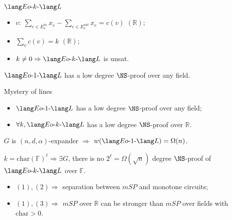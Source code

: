 \begin{frame}{$\EoL[k]$}
    \begin{minipage}{0.5 \linewidth}
        
    \end{minipage}%
    \begin{minipage}{0.5 \linewidth}
        \pause
        \pause
        \begin{itemize}
            \item $v: ~ \sum\limits_{e \in E^{in}_v} x_{e} - \sum\limits_{e \in E^{out}_v} x_{e} = c(v)$
                {\color{red} $(\mathbb{R})$};
            \item $\sum\limits_{v} c(v) = k$ {\color{red} $(\mathbb{R})$};
            \item $k \neq 0 \Rightarrow \EoL[k]$ is unsat. 
        \end{itemize}
    \end{minipage}

    \pause
    \begin{lemma}
        $\EoL[1]$ has a low degree $\NS$-proof over any field.
    \end{lemma}
\end{frame}

\begin{frame}{Mystery of lines}

    \begin{lemma}[1]
        \begin{itemize}
            \item $\EoL[1]$ has a low degree $\NS$-proof over any field;
            \item $\forall k, \EoL[k]$ has a low degree $\NS$-proof over $\mathbb{R}$.
        \end{itemize}
    \end{lemma}

    \begin{lemma}[2]
        $G$ is $(n, d, \alpha)$-expander $\Rightarrow$ $w(\EoL[1]) = \Omega(n)$.
    \end{lemma}

    \begin{lemma}[3]
        $k = \mathrm{char}(\mathbb{F})^{\ell} \Rightarrow \exists G$, there is no $2^{\ell} =
        \Omega(\sqrt{n})$ degree $\NS$-proof of $\EoL[k]$ over $\mathbb{F}$.
    \end{lemma}

    \begin{itemize}
        \item $(1), (2) \Rightarrow$ separation between $mSP$ and monotone circuits;
        \item $(1), (3) \Rightarrow$ $mSP$ over $\mathbb{R}$ can be stronger than $mSP$ over fields with
            $\mathrm{char} > 0$. 
    \end{itemize}

\end{frame}


